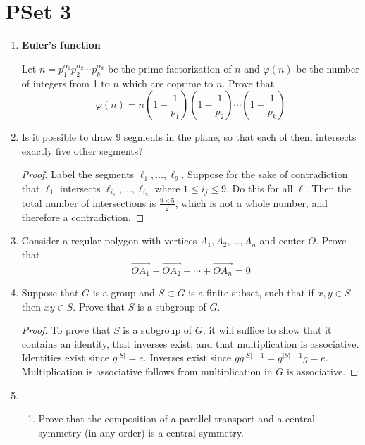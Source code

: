 \documentclass[../main.tex]{subfiles}
\begin{document}
\section{PSet 3}
\begin{enumerate}
    \item {}\textbf{Euler's function}\par
    Let $n=p_1^{\alpha_1}p_2^{\alpha_2}\cdots p_k^{\alpha_k}$ be the prime factorization of $n$ and $\varphi(n)$ be the number of integers from 1 to $n$ which are coprime to $n$. Prove that
    \begin{equation*}
        \varphi(n) = n\left( 1-\frac{1}{p_1} \right)\left( 1-\frac{1}{p_2} \right)\cdots\left( 1-\frac{1}{p_k} \right)
    \end{equation*}
    \item Is it possible to draw 9 segments in the plane, so that each of them intersects exactly five other segments?
    \begin{proof}
        Label the segments $\ell_1,\dots,\ell_9$. Suppose for the sake of contradiction that $\ell_1$ intersects $\ell_{i_1},\dots,\ell_{i_5}$ where $1\leq i_j\leq 9$. Do this for all $\ell$. Then the total number of intersections is $\frac{9\times 5}{2}$, which is not a whole number, and therefore a contradiction.
    \end{proof}
    \item Consider a regular polygon with vertices $A_1,A_2,\dots,A_n$ and center $O$. Prove that
    \begin{equation*}
        \overrightarrow{OA_1}+\overrightarrow{OA_2}+\cdots+\overrightarrow{OA_n} = 0
    \end{equation*}
    \item Suppose that $G$ is a group and $S\subset G$ is a finite subset, such that if $x,y\in S$, then $xy\in S$. Prove that $S$ is a subgroup of $G$.
    \begin{proof}
        To prove that $S$ is a subgroup of $G$, it will suffice to show that it contains an identity, that inverses exist, and that multiplication is associative. Identities exist since $g^{|S|}=e$. Inverses exist since $gg^{|S|-1}=g^{|S|-1}g=e$. Multiplication is associative follows from multiplication in $G$ is associative.
    \end{proof}
    \item 
    \begin{enumerate}
        \item Prove that the composition of a parallel transport and a central symmetry (in any order) is a central symmetry.

\end{enumerate}
\end{enumerate}
\end{document}
